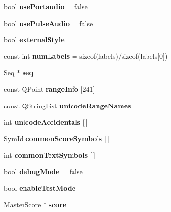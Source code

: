 \begin{DoxyCompactItemize}
\mbox{\label{namespace_ms_af3f6e043e4ecbc3c6c03edbf9b675f91}} 
bool {\bfseries use\+Portaudio} = false
\item 
\mbox{\label{namespace_ms_aeddc6b5aaa7e9697c40adb304a457657}} 
bool {\bfseries use\+Pulse\+Audio} = false
\item 
\mbox{\label{namespace_ms_a18289db7344dcde0c9caacbb4c2a33ca}} 
bool {\bfseries external\+Style}
\item 
\mbox{\label{namespace_ms_ab474e090dd0431e28bc8a8dcfa6d2260}} 
const int {\bfseries num\+Labels} = sizeof(labels)/sizeof(labels\mbox{[}0\mbox{]})
\item 
\mbox{\label{namespace_ms_a1a43a84e57fe33057a3e17aa85488d5f}} 
\hyperlink{class_ms_1_1_seq}{Seq} $\ast$ {\bfseries seq}
\item 
\mbox{\label{namespace_ms_a40881e5e028709a590d2080550851a1a}} 
const Q\+Point {\bfseries range\+Info} \mbox{[}241\mbox{]}
\item 
\mbox{\label{namespace_ms_a78fced6293cc90475256691f4f83430a}} 
const Q\+String\+List {\bfseries unicode\+Range\+Names}
\item 
int {\bfseries unicode\+Accidentals} \mbox{[}$\,$\mbox{]}
\item 
\mbox{\label{namespace_ms_a1bd7985cd00e8ba110f44a2279919052}} 
Sym\+Id {\bfseries common\+Score\+Symbols} \mbox{[}$\,$\mbox{]}
\item 
\mbox{\label{namespace_ms_abe917f40139ae0109e1355d04b45aeb9}} 
int {\bfseries common\+Text\+Symbols} \mbox{[}$\,$\mbox{]}
\item 
\mbox{\label{namespace_ms_afb2ce0f32eeaf8560478ba795a7f7cdb}} 
bool {\bfseries debug\+Mode} = false
\item 
\mbox{\label{namespace_ms_a0a83296066ceb60f28e37b30ec2ea128}} 
bool {\bfseries enable\+Test\+Mode}
\item 
\mbox{\label{namespace_ms_ac73e3fc8c3d2ea71f2bc2cd908c75d19}} 
\hyperlink{class_ms_1_1_master_score}{Master\+Score} $\ast$ {\bfseries score}
\end{DoxyCompactItemize}


